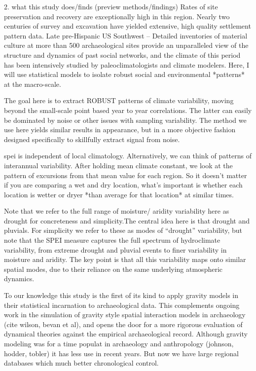 \documentclass[fleqn,10pt]{wlscirep}
\begin{document}
2. what this study does/finds (preview methods/findings)
Rates of site preservation and recovery are exceptionally high in this region. Nearly two centuries of survey and excavation have yielded extensive, high quality settlement pattern data.
Late pre-Hispanic US Southwest -- Detailed inventories of material culture at more than 500 archaeological sites provide an unparalleled view of the structure and dynamics of past social networks, and the climate of this period has been intensively studied by paleoclimatologists and climate modelers. Here, I will use statistical models to isolate robust social and environmental *patterns* at the macro-scale.

The goal here is to extract ROBUST patterns of climate variability, moving beyond the small-scale point based year to year correlations. The latter can easily be dominated by noise or other issues with sampling variability. The method we use here yields similar results in appearance, but in a more objective fashion designed specifically to skillfully extract signal from noise.

spei is independent of local climatology. Alternatively, we can think of patterns of interannual variability. After holding mean climate constant, we look at the pattern of excursions from that mean value for each region. So it doesn't matter if you are comparing a wet and dry location, what's important is whether each location is wetter or dryer *than average for that location* at similar times.

Note that we refer to the full range of moisture/ aridity variability here as drought for concreteness and simplicity.The central idea here is that drought and pluvials. For simplicity we refer to these as modes of ``drought'' variability, but note that the SPEI measure captures the full spectrum of hydroclimate variability, from extreme drought and pluvial events to finer variability in moisture and aridity. The key point is that all this variability maps onto similar spatial modes, due to their reliance on the same underlying atmospheric dynamics.

To our knowledge this study is the first of its kind to apply gravity models in their statistical incarnation to archaeological data. This complements ongoing work in the simulation of gravity style spatial interaction models  in archaeology (cite wilson, bevan et al), and opens the door for a more rigorous evaluation of dynamical theories against the empirical archaeological record.
Although gravity modeling was for a time populat in archaeology and anthropology (johnson, hodder, tobler) it has less use in recent years. But now we have large regional databases which much better chronological control.
\end{document}

